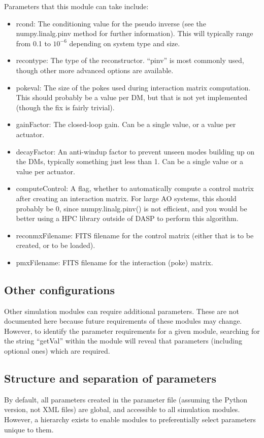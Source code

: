 \documentclass{article}
\begin{document}
Parameters that this module can take include:
\begin{itemize}
\item rcond: The conditioning value for the pseudo inverse (see
 the numpy.linalg.pinv method for further information).  This will
 typically range from 0.1 to $10^{-6}$ depending on system type and
 size.
\item recontype: The type of the reconstructor.  ``pinv'' is most
  commonly used, though other more advanced options are available.
\item pokeval: The size of the pokes used during interaction matrix
  computation.  This should probably be a value per DM, but that is
  not yet implemented (though the fix is fairly trivial).
\item gainFactor: The closed-loop gain.  Can be a single value, or a
  value per actuator.
\item decayFactor: An anti-windup factor to prevent unseen modes
  building up on the DMs, typically something just less than 1.  Can
  be a single value or a value per actuator.
\item computeControl: A flag, whether to automatically compute a
  control matrix after creating an interaction matrix.  For large AO
  systems, this should probably be 0, since numpy.linalg.pinv() is not
  efficient, and you would be better using a HPC library outside of
  DASP to perform this algorithm.
\item reconmxFilename: FITS filename for the control matrix (either
  that is to be created, or to be loaded).
\item pmxFilename: FITS filename for the interaction (poke) matrix.
\end{itemize}

\subsection{Other configurations}
Other simulation modules can require additional parameters.  These are
not documented here because future requirements of these modules may
change.  However, to identify the parameter requirements for a given
module, searching for the string ``getVal'' within the module will
reveal that parameters (including optional ones) which are required.

\subsection{Structure and separation of parameters}
By default, all parameters created in the parameter file (assuming the
Python version, not XML files) are global, and accessible to all
simulation modules.  However, a hierarchy exists to enable modules to
preferentially select parameters unique to them.  
\end{document}
